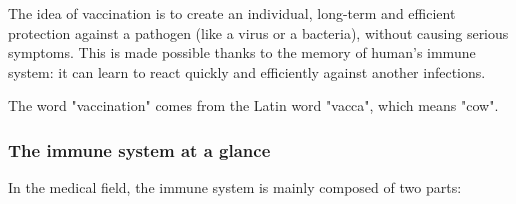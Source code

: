 \documentclass{article}
\begin{document}
            The idea of vaccination is to create an individual, long-term and efficient protection against a pathogen (like a virus or a bacteria), without causing serious symptoms.
            This is made possible thanks to the memory of human's immune system: it can learn to react quickly and efficiently against another infections.

            The word "vaccination" comes from the Latin word "vacca", which means "cow".

            \subsubsection*{The immune system at a glance}

                In the medical field, the immune system is mainly composed of two parts:
\end{document}
